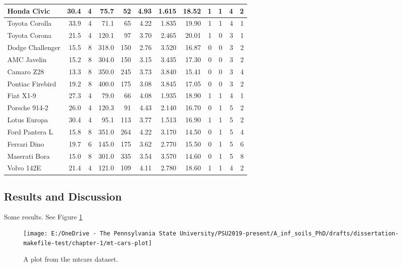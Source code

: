 \documentclass[
]{article}
\begin{document}
\begin{table}
\begin{tabular}[t]{l|r|r|r|r|r|r|r|r|r|r|r}
\hline
Honda Civic & 30.4 & 4 & 75.7 & 52 & 4.93 & 1.615 & 18.52 & 1 & 1 & 4 & 2\\
\hline
Toyota Corolla & 33.9 & 4 & 71.1 & 65 & 4.22 & 1.835 & 19.90 & 1 & 1 & 4 & 1\\
\hline
Toyota Corona & 21.5 & 4 & 120.1 & 97 & 3.70 & 2.465 & 20.01 & 1 & 0 & 3 & 1\\
\hline
Dodge Challenger & 15.5 & 8 & 318.0 & 150 & 2.76 & 3.520 & 16.87 & 0 & 0 & 3 & 2\\
\hline
AMC Javelin & 15.2 & 8 & 304.0 & 150 & 3.15 & 3.435 & 17.30 & 0 & 0 & 3 & 2\\
\hline
Camaro Z28 & 13.3 & 8 & 350.0 & 245 & 3.73 & 3.840 & 15.41 & 0 & 0 & 3 & 4\\
\hline
Pontiac Firebird & 19.2 & 8 & 400.0 & 175 & 3.08 & 3.845 & 17.05 & 0 & 0 & 3 & 2\\
\hline
Fiat X1-9 & 27.3 & 4 & 79.0 & 66 & 4.08 & 1.935 & 18.90 & 1 & 1 & 4 & 1\\
\hline
Porsche 914-2 & 26.0 & 4 & 120.3 & 91 & 4.43 & 2.140 & 16.70 & 0 & 1 & 5 & 2\\
\hline
Lotus Europa & 30.4 & 4 & 95.1 & 113 & 3.77 & 1.513 & 16.90 & 1 & 1 & 5 & 2\\
\hline
Ford Pantera L & 15.8 & 8 & 351.0 & 264 & 4.22 & 3.170 & 14.50 & 0 & 1 & 5 & 4\\
\hline
Ferrari Dino & 19.7 & 6 & 145.0 & 175 & 3.62 & 2.770 & 15.50 & 0 & 1 & 5 & 6\\
\hline
Maserati Bora & 15.0 & 8 & 301.0 & 335 & 3.54 & 3.570 & 14.60 & 0 & 1 & 5 & 8\\
\hline
Volvo 142E & 21.4 & 4 & 121.0 & 109 & 4.11 & 2.780 & 18.60 & 1 & 1 & 4 & 2\\
\hline
\end{tabular}
\end{table}

\hypertarget{results-and-discussion}{%
\subsection{Results and Discussion}\label{results-and-discussion}}

Some results. See Figure \ref{fig:mt-cars-plot}

\begin{figure}
\texttt{[image: E:/OneDrive - The Pennsylvania State University/PSU2019-present/A\_inf\_soils\_PhD/drafts/dissertation-makefile-test/chapter-1/mt-cars-plot]} \caption{A plot from the mtcars dataset.}\label{fig:mt-cars-plot}
\end{figure}
\end{document}
